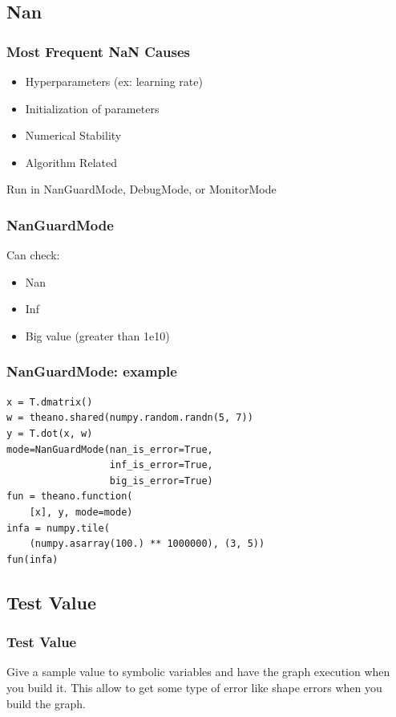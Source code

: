 \documentclass[utf8x,xcolor=pdftex,dvipsnames,table]{beamer}
\begin{document}
\subsection{Nan}
\begin{frame}
  \frametitle{Most Frequent NaN Causes}
\begin{itemize}
\item Hyperparameters (ex: learning rate)
\item Initialization of parameters
\item Numerical Stability
\item Algorithm Related
\end{itemize}
Run in NanGuardMode, DebugMode, or MonitorMode
\end{frame}

\begin{frame}[fragile]
  \frametitle{NanGuardMode}
Can check:
\begin{itemize}
\item Nan
\item Inf
\item Big value (greater than 1e10)
\end{itemize}
\end{frame}

\begin{frame}[fragile]
  \frametitle{NanGuardMode: example}
\begin{lstlisting}
x = T.dmatrix()
w = theano.shared(numpy.random.randn(5, 7))
y = T.dot(x, w)
mode=NanGuardMode(nan_is_error=True,
                  inf_is_error=True,
                  big_is_error=True)
fun = theano.function(
    [x], y, mode=mode)
infa = numpy.tile(
    (numpy.asarray(100.) ** 1000000), (3, 5))
fun(infa)
\end{lstlisting}
\end{frame}

\subsection{Test Value}
\begin{frame}[fragile]
  \frametitle{Test Value}

Give a sample value to symbolic variables and have the graph execution
when you build it. This allow to get some type of error like shape
errors when you build the graph.
 \vspace{1cm}
\end{frame}
\end{document}
